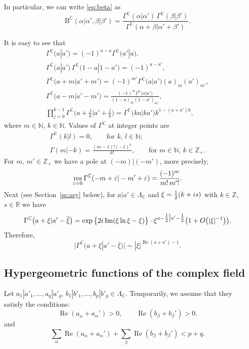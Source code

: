 \documentclass[11pt]{article}
\numberwithin{equation}{section}
\numberwithin{equation}{section}
\renewcommand{\Re}{\mathop {\mathrm {Re}}\nolimits}
\newcommand{\res}{\mathop {\mathrm {res}}\nolimits}
\def\ov{\overline}
\renewcommand{\Re}{\mathop {\mathrm {Re}}\nolimits}
\renewcommand{\Im}{\mathop {\mathrm {Im}}\nolimits}
\def\R {{\mathbb R }}
\def\C {{\mathbb C }}
\def\Z{{\mathbb Z}}
\def\N{{\mathbb N}}
\def\epsilon{\varepsilon}
\def\B{\mathrm B}
\def\B{\mathrm{B}}
\begin{document}
\begin{Remark} In particular, we can write \eqref{eq:beta} as
\[
\B^\C(\alpha|\alpha',\beta|\beta')=
\frac{\Gamma^\C(\alpha|\alpha')\,\Gamma^\C(\beta|\beta')}
{\Gamma^\C(\alpha+\beta|\alpha'+\beta')}.
\]
\end{Remark}

It is easy to see that
\begin{subequations}
\begin{gather}
\Gamma^\C\big(a|a'\big)=(-1)^{a-a} \Gamma^\C\big(a'|a\big),\label{eq:symmetry} \\
\Gamma^\C\big(a|a'\big)\, \Gamma^\C\big(1-a|1-a'\big) =(-1)^{a-a'},\label{eq:gamma-complement} \\
\Gamma^\C\big(a+m\big|a'+m'\big) =(-1)^{m'} \Gamma^\C\big(a\big|a'\big)(a)_m(a')_{m'}, \label{eq:shift1} \\
 \Gamma^\C\big(a-m\big|a'-m'\big) =\frac{(-1)^{m} \Gamma^\C\big(a\big|a'\big)}{(1-a)_m(1-a')_{m'}}, \label{eq:shift2} \\
\prod_{j=0}^{k-1}\Gamma^\C\big(a+\tfrac jk\big|a'+\tfrac jk \big)=\Gamma^\C\big(ka\big|ka'\big)k^{1-(a+a')k},\label{eq:gamma-gauss}
\end{gather}
\end{subequations}
where $m\in\N$, $k\in\N$.
Values of $\Gamma^\C$ at integer points are
\begin{gather*}
 \Gamma^\C(k|l) = 0,\qquad \text{for $k$, $l\in\N$;} \\
 \Gamma(m|-k) =\frac{(m-1)!(-1)^k}{k!},\qquad \text{for $m\in \N$, $k\in \Z_+$}.
\end{gather*}
For $m$, $m'\in\Z_+$ we have a pole at $(-m)|(-m')$, more precisely,
\begin{equation}
\res\limits_{\epsilon=0}
\Gamma^\C(-m+\epsilon|-m'+\epsilon)=\frac{(-1)^m}{m!\, m'!}.
\label{eq:res-gamma}
\end{equation}
Next (see Section~\ref{ss:asy} below),
for $a|a'\in\Lambda_\C$ and $\xi=\frac12(k+{\rm i}s)$
with $k\in\Z$, $s\in \R$ we have
\begin{equation}
\Gamma^\C\big(a+\xi|a'-\ov \xi\big)=
\exp\big\{2{\rm i}\Im (\xi\ln \xi-\xi)\big\}\cdot \xi^{a-\tfrac12\big|a'-\tfrac12} \big(1+O\big(|\xi|^{-1}\big)\big).
\label{eq:asy1}
\end{equation}
Therefore,
\begin{equation}
\big| \Gamma^\C\big(a+\xi|a'-\ov \xi\big)\big|\sim |\xi|^{\Re(a+a')-1}.
\label{eq:asy2}
\end{equation}

\subsection{Hypergeometric functions of the complex field}\label{ss:def}
Let $a_1|a'_1,\dots, a_q|a'_q$, $b_1|b'_1,\dots,b_p|b'_p\in \Lambda_\C$.
Temporarily, we assume that they satisfy the conditions:
\begin{equation}
\Re(a_\alpha+a_\alpha')>0,\qquad \Re(b_\beta+b_\beta')>0.
\label{eq:cond1}
\end{equation}
and
\begin{equation}
\sum_\alpha \Re(a_\alpha+a_\alpha')+\sum_\beta\Re(b_\beta+b_\beta')<p+q.
 \label{eq:cond2}
\end{equation}
\end{document}
